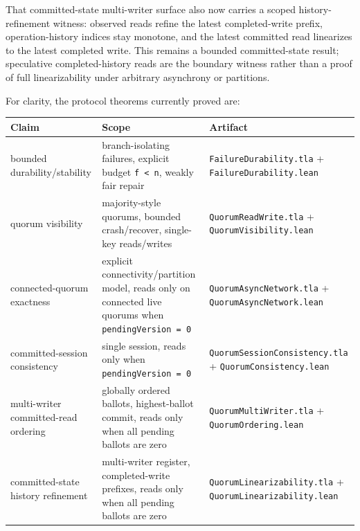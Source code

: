 \documentclass[
  11pt,
]{article}
\newcounter{none} %
\begin{document}
That committed-state multi-writer surface also now carries a scoped
history-refinement witness: observed reads refine the latest
completed-write prefix, operation-history indices stay monotone, and the
latest committed read linearizes to the latest completed write. This
remains a bounded committed-state result; speculative completed-history
reads are the boundary witness rather than a proof of full
linearizability under arbitrary asynchrony or partitions.

For clarity, the protocol theorems currently proved are:

{\def\LTcaptype{none} %
\begin{longtable}[]{@{}
  >{\raggedright\arraybackslash}p{}
  >{\raggedright\arraybackslash}p{}
  >{\raggedright\arraybackslash}p{}@{}}
\toprule\noalign{}
\begin{minipage}[b]{\linewidth}\raggedright
Claim
\end{minipage} & \begin{minipage}[b]{\linewidth}\raggedright
Scope
\end{minipage} & \begin{minipage}[b]{\linewidth}\raggedright
Artifact
\end{minipage} \\
\midrule\noalign{}
\endhead
\bottomrule\noalign{}
\endlastfoot
bounded durability/stability & branch-isolating failures, explicit
budget \texttt{f\ \textless{}\ n}, weakly fair repair &
\texttt{FailureDurability.tla} + \texttt{FailureDurability.lean} \\
quorum visibility & majority-style quorums, bounded crash/recover,
single-key reads/writes & \texttt{QuorumReadWrite.tla} +
\texttt{QuorumVisibility.lean} \\
connected-quorum exactness & explicit connectivity/partition model,
reads only on connected live quorums when \texttt{pendingVersion\ =\ 0}
& \texttt{QuorumAsyncNetwork.tla} + \texttt{QuorumAsyncNetwork.lean} \\
committed-session consistency & single session, reads only when
\texttt{pendingVersion\ =\ 0} & \texttt{QuorumSessionConsistency.tla} +
\texttt{QuorumConsistency.lean} \\
multi-writer committed-read ordering & globally ordered ballots,
highest-ballot commit, reads only when all pending ballots are zero &
\texttt{QuorumMultiWriter.tla} + \texttt{QuorumOrdering.lean} \\
committed-state history refinement & multi-writer register,
completed-write prefixes, reads only when all pending ballots are zero &
\texttt{QuorumLinearizability.tla} +
\texttt{QuorumLinearizability.lean} \\
\end{longtable}
}
\end{document}
